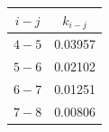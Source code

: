 \documentclass{article}
\begin{document}
\vspace{0.1in}
\begin{center}
\begin{tabular}{c c}
$i-j$ & $k_{i-j}$ \\
\hline
$4-5$ & 0.03957 \\
$5-6$ & 0.02102 \\
$6-7$ & 0.01251 \\
$7-8$ & 0.00806
\end{tabular}
\end{center}
\vspace{0.1in}
\end{document}
